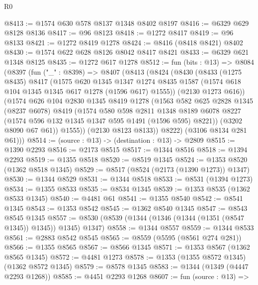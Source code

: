 \begin{lexlean}{R0}
\begin{coremodule}
@8413 := @1574 @630 @578 @8137 @1348 @8402 @8197
@8416 := @6329 @629 @8128 @8136
@8417 := @96 @8123
@8418 := @1272 @8417
@8419 := @96 @8133
@8421 := @1272 @8419 @1278
@8424 := @8416 (@8418 @8421) @8402
@8430 := @1574 @622 @628 @8126 @8042 @8417 @8421
@8433 := @6329 @621 @1348 @8125
@8435 := @1272 @617 @1278
@8512 := fun (bits : @13) =>
  @8084
    (@8397
      (fun ("_" : @8398) =>
      @8407
        (@8413
          (@8424
            (@8430
              (@8433
                (@1275 @8435)
                @8417
                (@1575
                  @620
                  @1345
                  @1347
                  @1274
                  @8435
                  @1587
                  (@1574 @618 @104 @1345 @1345 @617 @1278 (@1596 @617) @1555))
                (@2130 @1273 @616))
              (@1574
                @626
                @104
                @2830
                @1345
                @8419
                @1278
                (@1563
                  @582
                  @625
                  @2828
                  @1345
                  (@8237 @6078)
                  @8419
                  (@1574
                    @580
                    @598
                    @2811
                    @1348
                    @8189
                    @6078
                    @8227
                    (@1574 @596 @132 @1345 @1347 @595 @1491 (@1596 @595) @8221))
                  (@3202 @8090 @67 @61))
                @1555))
            (@2130 @8123 @8133))
          @8222)
        (@3106 @8134 @281 @61)))
@8514 := (source : @13) -> (destination : @13) -> @2809
@8515 := @1390 @2293
@8516 := @2173 @8515
@8517 := @1344 @8516
@8518 := @1394 @2293
@8519 := @1355 @8518
@8520 := @8519 @1345
@8524 := @1353 @8520 (@1362 @8518 @1345)
@8529 := @8517 (@8524 (@2173 (@1390 @1273)) @1347)
@8530 := @1344 @8529
@8531 := @1344 @8518
@8533 := @8531 (@1394 @1273)
@8534 := @1355 @8533
@8535 := @8534 @1345
@8539 := @1353 @8535 (@1362 @8533 @1345)
@8540 := @4481 @61
@8541 := @1355 @8540
@8542 := @8541 @1345
@8543 := @1353 @8542
@8545 := @1362 @8540 @1345
@8547 := @8543 @8545 @1345
@8557 := @8530 (@8539 (@1344 (@1346 (@1344 (@1351 (@8547 @1345)) @1345)) @1345) @1347)
@8558 := @1344 @8557
@8559 := @1344 @8533
@8561 := @2883 @8542 @8545
@8565 := @8559 (@5595 (@8561 @274 @281))
@8566 := @1355 @8565
@8567 := @8566 @1345
@8571 := @1353 @8567 (@1362 @8565 @1345)
@8572 := @4481 @1273
@8578 := @1353 (@1355 @8572 @1345) (@1362 @8572 @1345)
@8579 := @8578 @1345
@8583 := @1344 (@1349 (@4447 @2293 @1268))
@8585 := @4451 @2293 @1268
@8607 := fun (source : @13) =>

\end{coremodule}
\end{lexlean}
